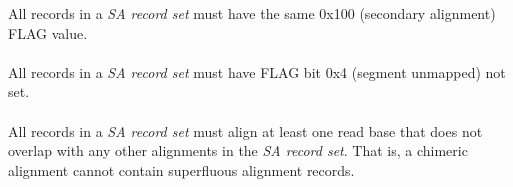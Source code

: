 \documentclass[10pt]{article}
\begin{document}
All records in a \textit{SA record set} must have the same 0x100 (secondary alignment) FLAG value.

\paragraph{}

All records in a \textit{SA record set} must have FLAG bit 0x4 (segment unmapped) not set.

\paragraph{}

All records in a \textit{SA record set} must align at least one read base that does not
overlap with any other alignments in the \textit{SA record set}.
That is, a chimeric alignment cannot contain superfluous alignment records.
\end{document}
